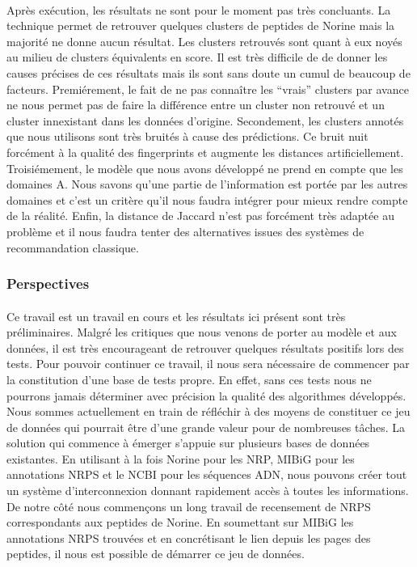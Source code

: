 \documentclass[12pt,french,twoside]{report}
\begin{document}
\paragraph{}Après exécution, les résultats ne sont pour le moment pas très concluants.
La technique permet de retrouver quelques clusters de peptides de Norine mais la majorité ne donne aucun résultat.
Les clusters retrouvés sont quant à eux noyés au milieu de clusters équivalents en score.
Il est très difficile de de donner les causes précises de ces résultats mais ils sont sans doute un cumul de beaucoup de facteurs.
Premiérement, le fait de ne pas connaître les ``vrais'' clusters par avance ne nous permet pas de faire la différence entre un cluster non retrouvé et un cluster innexistant dans les données d'origine.
Secondement, les clusters annotés que nous utilisons sont très bruités à cause des prédictions.
Ce bruit nuit forcément à la qualité des fingerprints et augmente les distances artificiellement.
Troisiémement, le modèle que nous avons développé ne prend en compte que les domaines A.
Nous savons qu'une partie de l'information est portée par les autres domaines et c'est un critère qu'il nous faudra intégrer pour mieux rendre compte de la réalité.
Enfin, la distance de Jaccard n'est pas forcément très adaptée au problème et il nous faudra tenter des alternatives issues des systèmes de recommandation classique.


\subsubsection{Perspectives}

\paragraph{}Ce travail est un travail en cours et les résultats ici présent sont très préliminaires.
Malgré les critiques que nous venons de porter au modèle et aux données, il est très encourageant de retrouver quelques résultats positifs lors des tests.
Pour pouvoir continuer ce travail, il nous sera nécessaire de commencer par la constitution d'une base de tests propre.
En effet, sans ces tests nous ne pourrons jamais déterminer avec précision la qualité des algorithmes développés.
Nous sommes actuellement en train de réfléchir à des moyens de constituer ce jeu de données qui pourrait être d'une grande valeur pour de nombreuses tâches.
La solution qui commence à émerger s'appuie sur plusieurs bases de données existantes.
En utilisant à la fois Norine pour les NRP, MIBiG pour les annotations NRPS et le NCBI pour les séquences ADN, nous pouvons créer tout un système d'interconnexion donnant rapidement accès à toutes les informations.
De notre côté nous commençons un long travail de recensement de NRPS correspondants aux peptides de Norine.
En soumettant sur MIBiG les annotations NRPS trouvées et en concrétisant le lien depuis les pages des peptides, il nous est possible de démarrer ce jeu de données.




\end{document}
